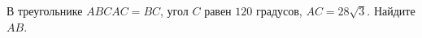 \begin{ex}
	\begin{condition}
		В треугольнике \( ABC AC = BC \), угол \( C \) равен \( 120 \) градусов, \( AC =28\sqrt{3}  \). Найдите \( AB \).
	\end{condition}
\end{ex}